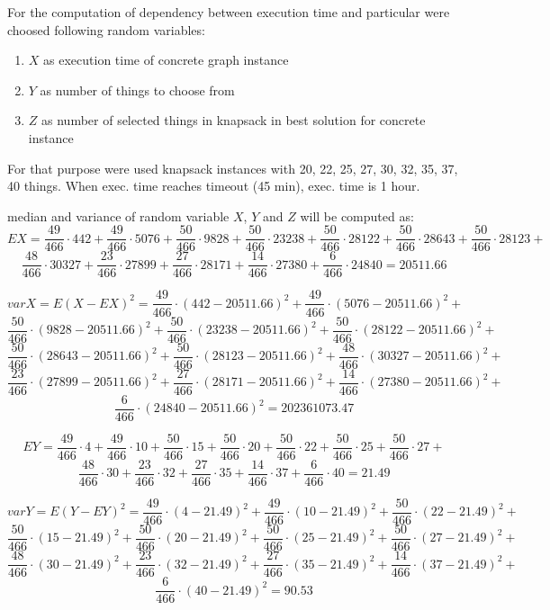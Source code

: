 \documentclass[11pt,twoside,a4paper]{book}
\begin{document}
For the computation of dependency between execution time and particular
were choosed following random variables:

\begin{enumerate}
  \item $X$ as execution time of concrete graph instance
  \item $Y$ as number of things to choose from
  \item $Z$ as number of selected things in knapsack in best solution for
  concrete instance
\end{enumerate}


For that purpose were used knapsack instances with 20, 22, 25, 27, 30, 32, 35,
37, 40 things. When exec. time reaches timeout (45
min), exec. time is 1 hour.

median and variance of random variable $X$, $Y$ and $Z$ will be computed as:
$$EX = \frac{49}{466}\cdot 442 + \frac{49}{466}\cdot 5076 + \frac{50}{466}\cdot
9828 + \frac{50}{466}\cdot 23238 +  \frac{50}{466}\cdot 28122 + \frac{50}{466}\cdot
28643 + \frac{50}{466}\cdot 28123 +$$
$$ \frac{48}{466}\cdot 30327 +\frac{23}{466}\cdot 27899 + \frac{27}{466}\cdot
28171 +\frac{14}{466}\cdot 27380 +\frac{6}{466}\cdot 24840 =20511.66$$


$$varX=E(X-EX)^2=\frac{49}{466}\cdot\left(442-20511.66
\right)^2+\frac{49}{466}\cdot\left(5076-20511.66\right)^2+$$
$$\frac{50}{466}\cdot\left(9828
-20511.66\right)^2+\frac{50}{466}\cdot\left(23238-20511.66\right)^2+\frac{50}{466}\cdot\left(28122-20511.66\right)^2+$$
$$\frac{50}{466}\cdot\left(28643-20511.66\right)^2+\frac{50}{466}\cdot\left(28123-20511.66\right)^2+\frac{48}{466}\cdot\left(30327-20511.66\right)^2+$$
$$\frac{23}{466}\cdot\left(27899-20511.66\right)^2+\frac{27}{466}\cdot\left(28171-20511.66\right)^2+\frac{14}{466}\cdot\left(27380-20511.66\right)^2+$$
$$\frac{6}{466}\cdot\left(24840-20511.66\right)^2=202361073.47$$

$$EY =  \frac{49}{466}\cdot 4 + \frac{49}{466}\cdot 10 + \frac{50}{466}\cdot
15 + \frac{50}{466}\cdot 20 +  \frac{50}{466}\cdot 22 +
\frac{50}{466}\cdot 25 + \frac{50}{466}\cdot 27 +$$
$$ \frac{48}{466}\cdot 30 +\frac{23}{466}\cdot 32 + \frac{27}{466}\cdot
35 +\frac{14}{466}\cdot 37 +\frac{6}{466}\cdot 40 =21.49$$

$$varY=E(Y-EY)^2=\frac{49}{466}\cdot\left(4-21.49
\right)^2+\frac{49}{466}\cdot\left(10-21.49\right)^2+\frac{50}{466}\cdot\left(22-21.49\right)^2+$$
$$\frac{50}{466}\cdot\left(15
-21.49\right)^2+\frac{50}{466}\cdot\left(20-21.49\right)^2+\frac{50}{466}\cdot\left(25-21.49\right)^2+\frac{50}{466}\cdot\left(27-21.49\right)^2+$$
$$\frac{48}{466}\cdot\left(30-21.49\right)^2+\frac{23}{466}\cdot\left(32-21.49\right)^2+\frac{27}{466}\cdot\left(35-21.49\right)^2+\frac{14}{466}\cdot\left(37-21.49\right)^2+$$
$$\frac{6}{466}\cdot\left(40-21.49\right)^2=90.53$$
$$$$
\end{document}
